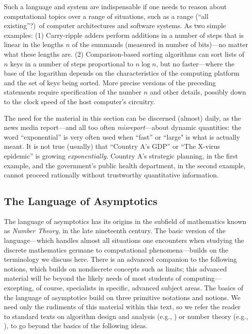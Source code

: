 Such a language and system are indispensable if one needs to reason about computational topics over a range of situations, such as a range (``all existing''?)~of computer architectures and software systems.  As two simple examples: (1) Carry-ripple adders perform additions in a number of steps that is linear in the lengths $n$ of the summands (measured in number of bits)---no matter what these lengths are.  (2) Comparison-based sorting algorithms can sort lists of $n$ keys in a number of steps proportional to $n \log n$, but no faster---where the base of the logarithm depends on the characteristics of the computing platform and the set of keys being sorted.  More precise versions of the preceding statements require specification of the number $n$ and other details, possibly down to the clock speed of the host computer's circuitry.

\smallskip

The need for the material in this section can be discerned (almost) daily, as the news media report---and all too often {\em misreport}---about dynamic quantities: the word ``exponential'' is
very often used when ``fast'' or ``large" is what is actually meant.  It is not true (usually) that ``Country A's GDP'' or ``The X-virus epidemic'' is growing {\em exponentially}.  Country A's strategic planning, in the first example, and the government's public health department, in the second example, cannot proceed rationally without trustworthy quantitative information.

\subsection{The Language of Asymptotics}
\label{sec:language-asymptotics}

The language of asymptotics has its origins in the subfield of mathematics known as {\it Number Theory}, in the late nineteenth century.  The basic version of the language---which handles almost all situations one encounters when studying the discrete mathematics germane to computational phenomena---builds on the terminology we discuss here.  There is an advanced companion to the following notions, which builds on nondiscrete concepts such as limits; this advanced material will be beyond the likely needs of most students of computing---excepting, of course, specialists in specific, advanced subject areas.  The basics of the language of asymptotics build on three primitive notations and notions.  We need only the rudiments of this material within this text, so we refer the reader to standard texts on algorithm design and analysis (e.g., \cite{CLRS}) or number theory (e.g., \cite{NivenZ80}), to go beyond the basics of the following ideas.

